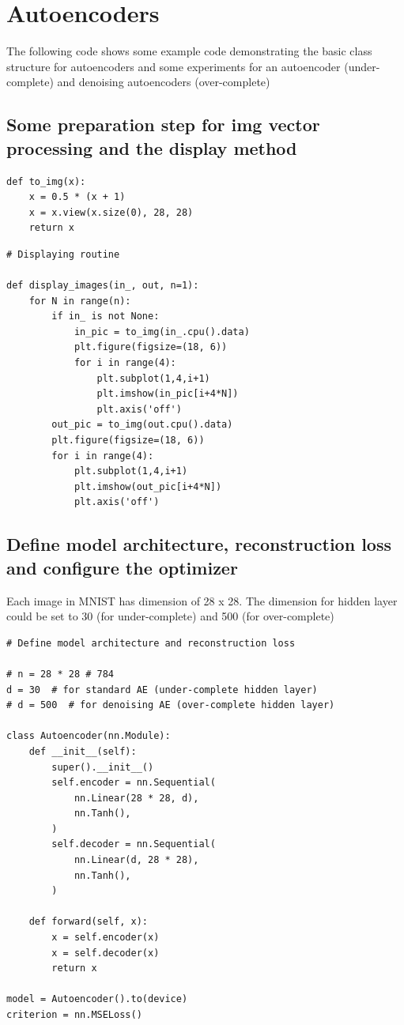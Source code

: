 \chapter{Autoencoders}
    
The following code shows some example code demonstrating the basic class structure for autoencoders and some experiments for an autoencoder (under-complete) and denoising autoencoders (over-complete)
\section{Some preparation step for img vector processing and the display method}
\begin{verbatim}
def to_img(x):
    x = 0.5 * (x + 1)
    x = x.view(x.size(0), 28, 28)
    return x       
\end{verbatim}
        
\begin{verbatim}
# Displaying routine

def display_images(in_, out, n=1):
    for N in range(n):
        if in_ is not None:
            in_pic = to_img(in_.cpu().data)
            plt.figure(figsize=(18, 6))
            for i in range(4):
                plt.subplot(1,4,i+1)
                plt.imshow(in_pic[i+4*N])
                plt.axis('off')
        out_pic = to_img(out.cpu().data)
        plt.figure(figsize=(18, 6))
        for i in range(4):
            plt.subplot(1,4,i+1)
            plt.imshow(out_pic[i+4*N])
            plt.axis('off')    
\end{verbatim}

\section{Define model architecture, reconstruction loss and configure the optimizer}

Each image in MNIST has dimension of 28 x 28. The dimension for hidden layer could be set to 30 (for under-complete) and 500 (for over-complete)

\begin{verbatim}
# Define model architecture and reconstruction loss

# n = 28 * 28 # 784
d = 30  # for standard AE (under-complete hidden layer)
# d = 500  # for denoising AE (over-complete hidden layer)

class Autoencoder(nn.Module):
    def __init__(self):
        super().__init__()
        self.encoder = nn.Sequential(
            nn.Linear(28 * 28, d),
            nn.Tanh(),
        )
        self.decoder = nn.Sequential(
            nn.Linear(d, 28 * 28),
            nn.Tanh(),
        )

    def forward(self, x):
        x = self.encoder(x)
        x = self.decoder(x)
        return x
    
model = Autoencoder().to(device)
criterion = nn.MSELoss()
\end{verbatim}


